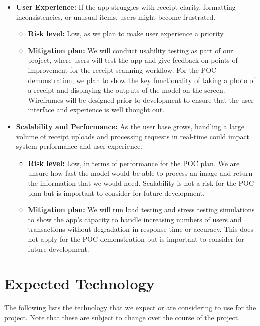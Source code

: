 \documentclass{article}
\begin{document}
\begin{itemize}
    \item \textbf{User Experience:} If the app struggles with receipt clarity,
    formatting inconsistencies, or unusual items, users might become frustrated.
    \begin{itemize}
        \item \textbf{Risk level:} Low, as we plan to make user experience a
        priority.
        \item \textbf{Mitigation plan:} We will conduct usability testing as
        part of our project, where users will test the app and give feedback on
        points of improvement for the receipt scanning workflow. For the POC
        demonstration, we plan to show the key functionality of taking a photo
        of a receipt and displaying the outputs of the model on the screen.
        Wireframes will be designed prior to development to ensure that the user
        interface and experience is well thought out.
    \end{itemize}
    
    \item \textbf{Scalability and Performance:} As the user base grows, handling
    a large volume of receipt uploads and processing requests in real-time could
    impact system performance and user experience.
    \begin{itemize}
        \item \textbf{Risk level:} Low, in terms of performance for the POC
        plan. We are unsure how fast the model would be able to process an image
        and return the information that we would need. Scalability is not a risk
        for the POC plan but is important to consider for future development.
        \item \textbf{Mitigation plan:} We will run load testing and stress
        testing simulations to show the app's capacity to handle increasing
        numbers of users and transactions without degradation in response time
        or accuracy. This does not apply for the POC demonstration but is
        important to consider for future development.
    \end{itemize}
\end{itemize}

\newpage

\section{Expected Technology}

The following lists the technology that we expect or are considering to use for
the project. Note that these are subject to change over the course of the
project.
\end{document}

